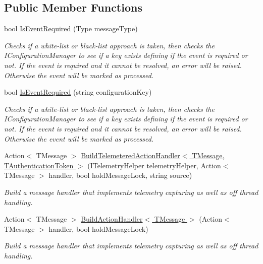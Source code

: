 \subsection*{Public Member Functions}
\begin{DoxyCompactItemize}
\item 
bool \hyperlink{interfaceCqrs_1_1Bus_1_1IBusHelper_acddf7635d6de08e3b09d552361fe4fda_acddf7635d6de08e3b09d552361fe4fda}{Is\+Event\+Required} (Type message\+Type)
\begin{DoxyCompactList}\small\item\em Checks if a white-\/list or black-\/list approach is taken, then checks the I\+Configuration\+Manager to see if a key exists defining if the event is required or not. If the event is required and it cannot be resolved, an error will be raised. Otherwise the event will be marked as processed. \end{DoxyCompactList}\item 
bool \hyperlink{interfaceCqrs_1_1Bus_1_1IBusHelper_af73d0d2aa8e98566acb4b2fb13a3e986_af73d0d2aa8e98566acb4b2fb13a3e986}{Is\+Event\+Required} (string configuration\+Key)
\begin{DoxyCompactList}\small\item\em Checks if a white-\/list or black-\/list approach is taken, then checks the I\+Configuration\+Manager to see if a key exists defining if the event is required or not. If the event is required and it cannot be resolved, an error will be raised. Otherwise the event will be marked as processed. \end{DoxyCompactList}\item 
Action$<$ T\+Message $>$ \hyperlink{interfaceCqrs_1_1Bus_1_1IBusHelper_a29751c186da5e2b042067af6a1be6d5d_a29751c186da5e2b042067af6a1be6d5d}{Build\+Telemetered\+Action\+Handler$<$ T\+Message, T\+Authentication\+Token $>$} (I\+Telemetry\+Helper telemetry\+Helper, Action$<$ T\+Message $>$ handler, bool hold\+Message\+Lock, string source)
\begin{DoxyCompactList}\small\item\em Build a message handler that implements telemetry capturing as well as off thread handling. \end{DoxyCompactList}\item 
Action$<$ T\+Message $>$ \hyperlink{interfaceCqrs_1_1Bus_1_1IBusHelper_ac69a1e4722e2839c2c180b9a06a8646c_ac69a1e4722e2839c2c180b9a06a8646c}{Build\+Action\+Handler$<$ T\+Message $>$} (Action$<$ T\+Message $>$ handler, bool hold\+Message\+Lock)
\begin{DoxyCompactList}\small\item\em Build a message handler that implements telemetry capturing as well as off thread handling. \end{DoxyCompactList}\end{DoxyCompactItemize}


